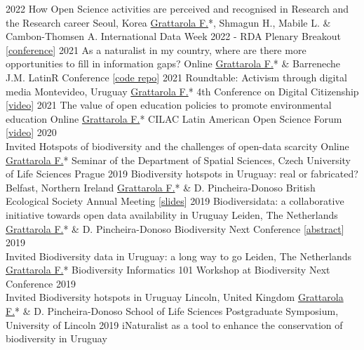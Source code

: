 \documentclass[9pt]{developercv} %
\begin{document}
\begin{entrylist}
	\entrylong
		{2022}
		{How Open Science activities are perceived and recognised in Research and the Research career}
		{Seoul, Korea}
		{\underline{Grattarola F.}*, Shmagun H., Mabile L. \& Cambon-Thomsen A. \slashsep International Data Week 2022 - RDA Plenary Breakout [\href{https://www.idw2022.org}{conference}]}
	\entrylong
		{2021}
		{As a naturalist in my country, where are there more opportunities to fill in information gaps?}
		{Online}
		{\underline{Grattarola F.}* \& Barreneche J.M. \slashsep LatinR Conference [\href{https://github.com/bienflorencia/LatinR2021}{code repo}]}
	\entrylong
		{2021}
		{Roundtable: Activism through digital media}
		{Montevideo, Uruguay}
		{\underline{Grattarola F.}* \slashsep 4th Conference on Digital Citizenship [\href{https://youtu.be/NNA46QEZVQI}{video}]}
	\entrylong
		{2021}
		{The value of open education policies to promote environmental education}
		{Online}
		{\underline{Grattarola F.}* \slashsep CILAC Latin American Open Science Forum [\href{https://youtu.be/W6i6y87p2IM}{video}]}
	\entrylong
		{2020\\\footnotesize{Invited}}
		{Hotspots of biodiversity and the challenges of open-data scarcity}
		{Online}
		{\underline{Grattarola F.}* \slashsep Seminar of the Department of Spatial Sciences, Czech University of Life Sciences Prague}
	\entrylong
		{2019}
		{Biodiversity hotspots in Uruguay: real or fabricated?}
		{Belfast, Northern Ireland}
		{\underline{Grattarola F.}* \& D. Pincheira-Donoso \slashsep British Ecological Society Annual Meeting [\href{https://flograttarola.com/pdf/FGrattarola_BES2019_WEB.pdf}{slides}]}
	\entrylong
		{2019}
		{Biodiversidata: a collaborative initiative towards open data availability in Uruguay}
		{Leiden, The Netherlands}
		{\underline{Grattarola F.}* \& D. Pincheira-Donoso \slashsep Biodiversity Next Conference [\href{https://flograttarola.com/pdf/BISS_article_37715.pdf}{abstract}]}
	\entrylong
		{2019\\\footnotesize{Invited}}
		{Biodiversity data in Uruguay: a long way to go}
		{Leiden, The Netherlands}
		{\underline{Grattarola F.}* \slashsep Biodiversity Informatics 101 Workshop at Biodiversity Next Conference}
	\entrylong
		{2019\\\footnotesize{Invited}}
		{Biodiversity hotspots in Uruguay}
		{Lincoln, United Kingdom}
		{\underline{Grattarola F.}* \& D. Pincheira-Donoso \slashsep School of Life Sciences Postgraduate Symposium, University of Lincoln}
	\entrylong
		{2019}
		{iNaturalist as a tool to enhance the conservation of biodiversity in Uruguay}

\end{entrylist}
\end{document}

